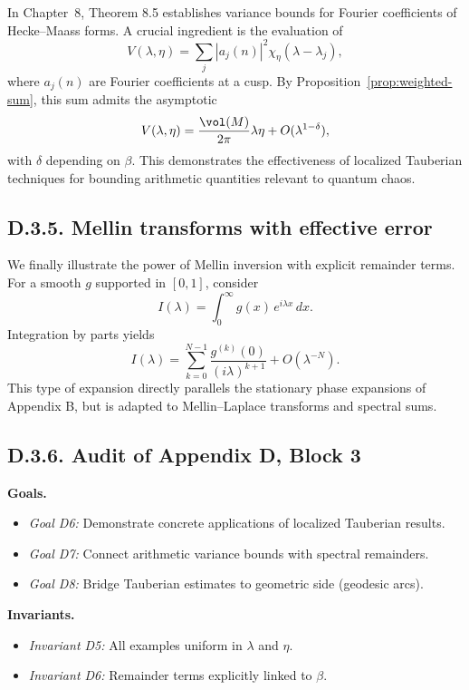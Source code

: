 \noindent In Chapter~8, Theorem 8.5 establishes variance bounds for Fourier coefficients of Hecke–Maass forms.  
A crucial ingredient is the evaluation of
\[
V(\lambda,\eta) = \sum_j |a_j(n)|^2 \chi_\eta(\lambda-\lambda_j),
\]
where $a_j(n)$ are Fourier coefficients at a cusp.  
By Proposition~\ref{prop:weighted-sum}, this sum admits the asymptotic
\[
V(\lambda,\eta) = \frac{\vol(M)}{2\pi}\lambda\eta + O(\lambda^{1-\delta}),
\]
with $\delta$ depending on $\beta$.  
This demonstrates the effectiveness of localized Tauberian techniques for bounding arithmetic quantities relevant to quantum chaos.

\medskip

\subsection*{D.3.5. Mellin transforms with effective error}

\noindent We finally illustrate the power of Mellin inversion with explicit remainder terms.  
For a smooth $g$ supported in $[0,1]$, consider
\[
I(\lambda) = \int_0^\infty g(x)\,e^{i\lambda x}\,dx.
\]
Integration by parts yields
\[
I(\lambda) = \sum_{k=0}^{N-1} \frac{g^{(k)}(0)}{(i\lambda)^{k+1}} + O(\lambda^{-N}).
\]
This type of expansion directly parallels the stationary phase expansions of Appendix B, but is adapted to Mellin–Laplace transforms and spectral sums.

\medskip

\subsection*{D.3.6. Audit of Appendix D, Block 3}

\noindent \textbf{Goals.}
\begin{itemize}
\item \emph{Goal D6:} Demonstrate concrete applications of localized Tauberian results.  
\item \emph{Goal D7:} Connect arithmetic variance bounds with spectral remainders.  
\item \emph{Goal D8:} Bridge Tauberian estimates to geometric side (geodesic arcs).  
\end{itemize}

\noindent \textbf{Invariants.}
\begin{itemize}
\item \emph{Invariant D5:} All examples uniform in $\lambda$ and $\eta$.  
\item \emph{Invariant D6:} Remainder terms explicitly linked to $\beta$.  
\end{itemize}

